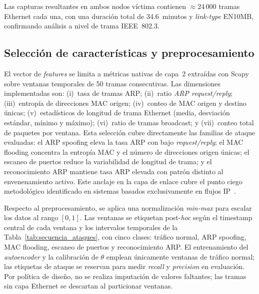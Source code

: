\documentclass[conference]{IEEEtran}
\newcommand{\trafonormal}{tráfico normal}
\newcommand{\arpspoof}{ARP spoofing}
\newcommand{\macflood}{MAC flooding}
\newcommand{\portscan}{escaneo de puertos}
\newcommand{\arprecon}{reconocimiento ARP}
\begin{document}
Las capturas resultantes en ambos nodos víctima
contienen $\approx$24\,000 tramas Ethernet cada una, con una duración
total de 34.6~minutos y \textit{link-type} EN10MB, confirmando análisis a
nivel de trama IEEE~802.3.

\subsection{Selección de características y preprocesamiento}
El vector de \textit{features} se limita a métricas nativas de capa~2
extraídas con Scapy sobre ventanas temporales de 50 tramas consecutivas.
Las dimensiones implementadas son: (i)~tasa de tramas ARP;
(ii)~ratio \textit{ARP request/reply}; (iii)~entropía de direcciones MAC
origen; (iv)~conteo de MAC origen y destino
únicas; (v)~estadísticos de longitud de trama Ethernet
(media, desviación estándar, mínimo y máximo); (vi)~ratio de
tramas broadcast; y (vii)~conteo total de paquetes por ventana. Esta
selección cubre directamente las familias de
ataque evaluadas: el ARP spoofing eleva la tasa ARP con bajo
\textit{request/reply}; el MAC flooding concentra la entropía MAC
y el número de direcciones origen únicas; el escaneo de puertos reduce
la variabilidad de longitud de trama; y el reconocimiento ARP mantiene
tasa ARP elevada con patrón distinto al envenenamiento activo.
Este anclaje en la capa de enlace cubre el punto ciego metodológico
identificado en sistemas basados exclusivamente en flujos
IP~\cite{sarhan2022,sun2022ccnc}.

Respecto al preprocesamiento, se aplica una normalización \textit{min-max}
para escalar los datos al rango $[0,1]$. Las ventanas se etiquetan
post-\textit{hoc} según el timestamp central de cada ventana y los
intervalos temporales de la Tabla~\ref{tab:secuencia_ataques}, con cinco
clases: \trafonormal, \arpspoof, \macflood,
\portscan{} y \arprecon. El entrenamiento del
\textit{autoencoder} y la calibración de $\theta$ emplean únicamente
ventanas de \trafonormal; las etiquetas de ataque se reservan para medir
\textit{recall} y \textit{precision} en evaluación. Por política de
diseño, no se realiza imputación de valores faltantes; las tramas sin
capa Ethernet se descartan al particionar ventanas.
\end{document}
